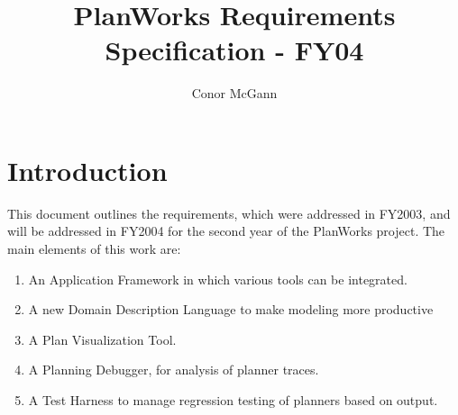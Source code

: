 \documentclass[twoside, 11pt]{article}
\author{Conor McGann}
\title{PlanWorks Requirements Specification - FY04}
\begin{document}
\maketitle

\section{Introduction}
This document outlines the requirements, which were addressed in FY2003, and will be addressed in FY2004 for the second year of the PlanWorks project. The main elements of this work are:
\begin{enumerate}
\item An Application Framework in which various tools can be integrated.
\item A new Domain Description Language to make modeling more productive
\item A Plan Visualization Tool.
\item A Planning Debugger, for analysis of planner traces.
\item A Test Harness to manage regression testing of planners based on output.
\end{enumerate}
\end{document}
